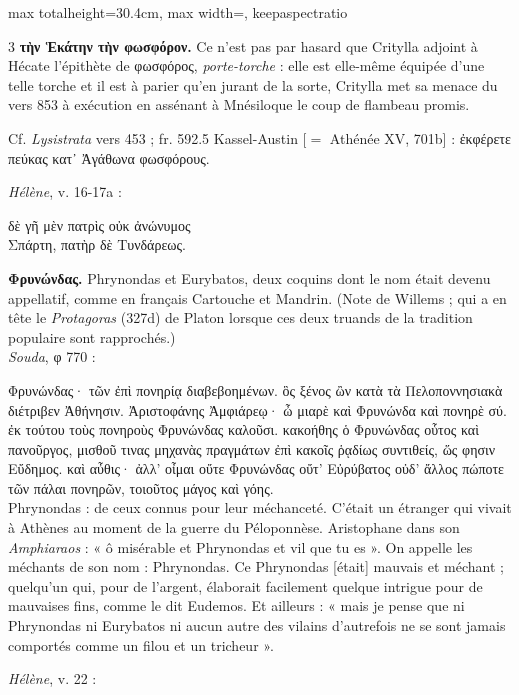 \documentclass[11pt,twoside]{book}
\newcommand{\italique}[1]{\textit{#1}}
\newcommand{\citComm}[1]{\begin{quoting}[vskip=0.4pt,leftmargin=0.7em,rightmargin=0.2em]#1\end{quoting}}
\newcommand{\francais}[1]{{\policeFr #1}}
\newcommand{\difference}[1]{\dotuline{#1}}
\begin{document}
\begin{adjustbox}{max totalheight=30.4cm, max width=\textwidth, keepaspectratio}
\begin{minipage}{\textwidth}
{\begin{multicols}{3}
 \textbf{τὴν Ἑκάτην τὴν φωσφόρον.} Ce n'est pas par hasard que Critylla adjoint à Hécate l'épithète de φωσφόρος, \italique{porte-torche} : elle est elle-même équipée d'une telle torche et il est à parier qu'en jurant de la sorte, Critylla met sa menace du vers 853 à exécution en assénant à Mnésiloque le coup de flambeau promis.
\par\vspace{1.5pt}
\noindent Cf. \italique{Lysistrata} vers 453 ; fr. 592.5 Kassel-Austin [$=$ Athénée XV, 701b] : ἐκφέρετε πεύκας κατ᾽ Ἀγάθωνα φωσφόρους.
\par\vspace{1.5pt}
 \textbf{} \italique{Hélène}, v. 16-17a :
\citComm{\difference{ἡμῖν} δὲ γῆ μὲν πατρὶς οὐκ ἀνώνυμος\\
Σπάρτη, πατὴρ δὲ Τυνδάρεως.}
\par\vspace{1.5pt}
 \textbf{Φρυνώνδας.} Phrynondas et Eurybatos, deux coquins dont le nom était devenu appellatif, comme en français Cartouche et Mandrin. (Note de Willems ; qui a en tête le \italique{Protagoras} (327d) de Platon lorsque ces deux truands de la tradition populaire sont rapprochés.)\\ \italique{Souda}, φ 770 :
\citComm{Φρυνώνδας· τῶν ἐπὶ πονηρίᾳ διαβεβοημένων. ὃς ξένος ὢν κατὰ τὰ Πελοποννησιακὰ διέτριβεν Ἀθήνησιν. Ἀριστοφάνης Ἀμφιάρεῳ· ὦ μιαρὲ καὶ Φρυνώνδα καὶ πονηρὲ σύ. ἐκ τούτου τοὺς πονηροὺς Φρυνώνδας καλοῦσι. κακοήθης ὁ Φρυνώνδας οὗτος καὶ πανοῦργος, μισθοῦ τινας μηχανὰς πραγμάτων ἐπὶ κακοῖς ῥᾳδίως συντιθείς, ὥς φησιν Εὔδημος. καὶ αὖθις· ἀλλ' οἶμαι οὔτε Φρυνώνδας οὔτ' Εὐρύβατος οὐδ' ἄλλος πώποτε τῶν πάλαι πονηρῶν, τοιοῦτος μάγος καὶ γόης.\\
\francais{Phrynondas : de ceux connus pour leur méchanceté. C'était un étranger qui vivait à Athènes au moment de la guerre du Péloponnèse. Aristophane dans son \italique{Amphiaraos} : « ô misérable et Phrynondas et vil que tu es ». On appelle les méchants de son nom : Phrynondas.
Ce Phrynondas [était] mauvais et méchant ; quelqu'un qui, pour de l'argent, élaborait facilement quelque intrigue pour de mauvaises fins, comme le dit Eudemos.
Et ailleurs : « mais je pense que ni Phrynondas ni Eurybatos ni aucun autre des vilains d'autrefois ne se sont jamais comportés comme un filou et un tricheur ».}
}
\par\vspace{1.5pt}
 \textbf{} \italique{Hélène}, v. 22 :

\end{multicols}}
\end{minipage}
\end{adjustbox}
\end{document}
